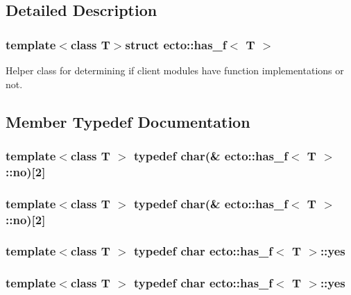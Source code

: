 \subsection{Detailed Description}
\subsubsection*{template$<$class T$>$struct ecto\-::has\-\_\-f$<$ T $>$}

Helper class for determining if client modules have function implementations or not. 

\subsection{Member Typedef Documentation}
\hypertarget{structecto_1_1has__f_ae0c6da775cf20caed616e24681af2807}{
\subsubsection[{no}]{\setlength{\rightskip}{0pt plus 5cm}template$<$class T $>$ typedef char(\& {\bf ecto\-::has\-\_\-f}$<$ T $>$\-::no)\mbox{[}2\mbox{]}}}\label{structecto_1_1has__f_ae0c6da775cf20caed616e24681af2807}
\hypertarget{structecto_1_1has__f_ae0c6da775cf20caed616e24681af2807}{
\subsubsection[{no}]{\setlength{\rightskip}{0pt plus 5cm}template$<$class T $>$ typedef char(\& {\bf ecto\-::has\-\_\-f}$<$ T $>$\-::no)\mbox{[}2\mbox{]}}}\label{structecto_1_1has__f_ae0c6da775cf20caed616e24681af2807}
\hypertarget{structecto_1_1has__f_a3fb902f1eed02919195aff1a6b28eb76}{
\subsubsection[{yes}]{\setlength{\rightskip}{0pt plus 5cm}template$<$class T $>$ typedef char {\bf ecto\-::has\-\_\-f}$<$ T $>$\-::{\bf yes}}}\label{structecto_1_1has__f_a3fb902f1eed02919195aff1a6b28eb76}
\hypertarget{structecto_1_1has__f_a3fb902f1eed02919195aff1a6b28eb76}{
\subsubsection[{yes}]{\setlength{\rightskip}{0pt plus 5cm}template$<$class T $>$ typedef char {\bf ecto\-::has\-\_\-f}$<$ T $>$\-::{\bf yes}}}\label{structecto_1_1has__f_a3fb902f1eed02919195aff1a6b28eb76}


